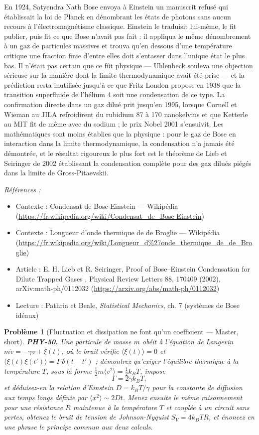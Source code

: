 \documentclass[11pt]{article}
\newtheorem{problem}{Problème}
\newenvironment{refs}{\par\small\noindent\emph{Références :}\begin{itemize}\setlength\itemsep{0pt}}{\end{itemize}\normalsize}
\begin{document}
\noindent En 1924, Satyendra Nath Bose envoya à Einstein un manuscrit refusé qui
établissait la loi de Planck en dénombrant les états de photons sans aucun recours à
l'électromagnétisme classique. Einstein le traduisit lui-même, le fit publier, puis fit ce que
Bose n'avait pas fait : il appliqua le même dénombrement à un gaz de particules massives et
trouva qu'en dessous d'une température critique une fraction finie d'entre elles doit s'entasser
dans l'unique état le plus bas. Il n'était pas certain que ce fût physique --- Uhlenbeck souleva une
objection sérieuse sur la manière dont la limite thermodynamique avait été prise --- et la
prédiction resta inutilisée jusqu'à ce que Fritz London propose en 1938 que la transition
superfluide de l'hélium 4 soit une condensation de ce type. La confirmation directe dans un gaz
dilué prit jusqu'en 1995, lorsque Cornell et Wieman au JILA refroidirent du rubidium 87 à
170 nanokelvins et que Ketterle au MIT fit de même avec du sodium ; le prix Nobel 2001 s'ensuivit.
Les mathématiques sont moins établies que la physique : pour le gaz de Bose en interaction dans la
limite thermodynamique, la condensation n'a jamais été démontrée, et le résultat rigoureux le plus
fort est le théorème de Lieb et Seiringer de 2002 établissant la condensation complète pour des
gaz dilués piégés dans la limite de Gross-Pitaevskii.

\begin{refs}
\item Contexte : Condensat de Bose-Einstein --- Wikipédia (\url{https://fr.wikipedia.org/wiki/Condensat_de_Bose-Einstein})
\item Contexte : Longueur d'onde thermique de de Broglie --- Wikipédia (\url{https://fr.wikipedia.org/wiki/Longueur_d%27onde_thermique_de_de_Broglie})
\item Article : E. H. Lieb et R. Seiringer, \og{} Proof of Bose--Einstein Condensation for Dilute Trapped Gases \fg{}, Physical Review Letters 88, 170409 (2002), arXiv:math-ph/0112032 (\url{https://arxiv.org/abs/math-ph/0112032})
\item Lecture : Pathria et Beale, \textit{Statistical Mechanics}, ch. 7 (systèmes de Bose idéaux)
\end{refs}

\bigskip

\begin{problem}[{Fluctuation et dissipation ne font qu'un coefficient --- Master, short}]
\textbf{PHY-50.} Une particule de masse $m$ obéit à l'équation de Langevin
$m\dot{v} = -\gamma v + \xi(t)$, où le bruit vérifie $\langle \xi(t)\rangle = 0$ et
$\langle \xi(t)\xi(t')\rangle = \Gamma\,\delta(t-t')$ ; démontrez qu'exiger l'équilibre thermique
à la température $T$, sous la forme
$\tfrac{1}{2}m\langle v^{2}\rangle = \tfrac{1}{2}k_B T$, impose
\[ \Gamma = 2\gamma k_B T, \]
et déduisez-en la relation d'Einstein $D = k_B T/\gamma$ pour la constante de diffusion aux
temps longs définie par $\langle x^{2}\rangle \sim 2Dt$. Menez ensuite le même raisonnement pour
une résistance $R$ maintenue à la température $T$ et couplée à un circuit sans pertes,
obtenez le bruit de tension de Johnson-Nyquist $S_V = 4k_B T R$, et énoncez en une phrase le
principe commun aux deux calculs.
\end{problem}
\end{document}
